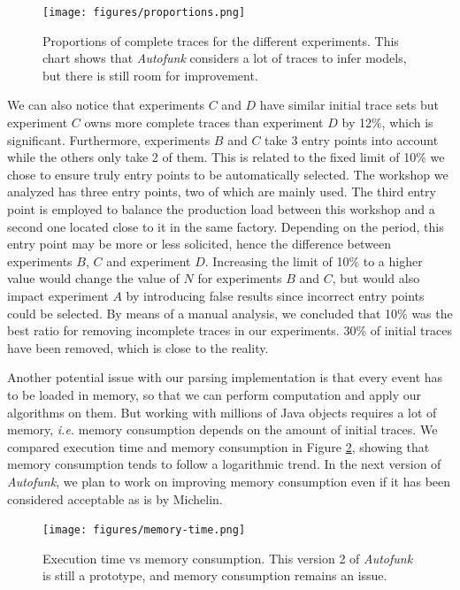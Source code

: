 \begin{figure}[ht]
  \texttt{[image: figures/proportions.png]}

  \caption{Proportions of complete traces for the different
  experiments. This chart shows that \textit{Autofunk} considers
  a lot of traces to infer models, but there is still room for
  improvement.}
  \label{fig:proportions}
\end{figure}

We can also notice that experiments $C$ and $D$ have similar
initial trace sets but experiment $C$ owns more complete traces
than experiment $D$ by 12\%, which is significant. Furthermore, experiments
$B$ and $C$ take 3 entry points into account while the others only
take 2 of them. This is related to the fixed limit of 10\% we
chose to ensure truly entry points to be automatically selected.
The workshop we analyzed has three entry points, two of which are
mainly used. The third entry point is employed to balance the
production load between this workshop and a second one located
close to it in the same factory. Depending on the period, this
entry point may be more or less solicited, hence the
difference between experiments $B$, $C$ and experiment $D$.
Increasing the limit of 10\% to a higher value would change the value
of $N$ for experiments $B$ and $C$, but would also impact
experiment $A$ by introducing false results since incorrect entry
points could be selected. By means of a manual analysis, we
concluded that 10\% was the best ratio for removing incomplete
traces in our experiments.  30\% of initial traces have been
removed, which is close to the reality.

Another potential issue with our parsing implementation is that
every event has to be loaded in memory, so that we can perform
computation and apply our algorithms on them. But working
with millions of Java objects requires a lot of memory, \emph{i.e.}
memory consumption depends on the amount of initial traces. We
compared execution time and memory consumption in Figure
\ref{fig:memory-time}, showing that memory consumption tends to
follow a logarithmic trend. In the next version of
\textit{Autofunk}, we plan to work on improving memory
consumption even if it has been considered acceptable as is by
Michelin.

\begin{figure}[ht]
  \texttt{[image: figures/memory-time.png]}

  \caption{Execution time vs memory consumption. This version 2 of
  \textit{Autofunk} is still a prototype, and memory consumption
  remains an issue.}
  \label{fig:memory-time}
\end{figure}

